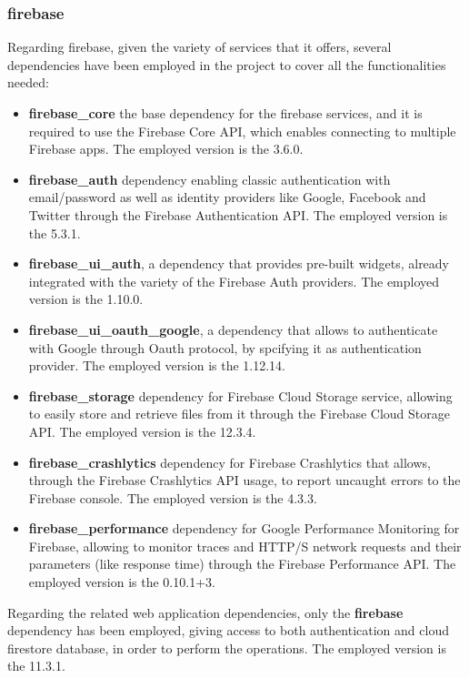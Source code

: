 \subsubsection{firebase}
Regarding firebase, given the variety of services that it offers, several dependencies have been employed in the project to cover all the functionalities needed:

\begin{itemize}[nosep] %
    \item \textbf{firebase\_core\:} the base dependency for the firebase services, and it is required to use the Firebase Core API, which enables connecting to multiple Firebase apps. The employed version is the 3.6.0.
    \item \textbf{firebase\_auth\:} dependency enabling classic authentication with email/password as well as identity providers like Google, Facebook and Twitter through the Firebase Authentication API. The employed version is the 5.3.1.
    \item \textbf{firebase\_ui\_auth}, a dependency that provides pre-built widgets, already integrated with the variety of the Firebase Auth providers. The employed version is the 1.10.0.
    \item \textbf{firebase\_ui\_oauth\_google}, a dependency that allows to authenticate with Google through Oauth protocol, by spcifying it as authentication provider. The employed version is the 1.12.14.
    \item \textbf{firebase\_storage\:} dependency for Firebase Cloud Storage service, allowing to easily store and retrieve files from it through the Firebase Cloud Storage API. The employed version is the 12.3.4.
    \item \textbf{firebase\_crashlytics\:} dependency for Firebase Crashlytics that allows, through the Firebase Crashlytics API usage, to report uncaught errors to the Firebase console. The employed version is the 4.3.3.
    \item \textbf{firebase\_performance\:} dependency for Google Performance Monitoring for Firebase, allowing to monitor traces and HTTP/S network requests and their parameters (like response time) through the Firebase Performance API. The employed version is the 0.10.1+3.
\end{itemize}

\noindent Regarding the related web application dependencies, only the \textbf{firebase} dependency has been employed, giving access to both authentication and cloud firestore database, in order to perform the operations. The employed version is the 11.3.1.

